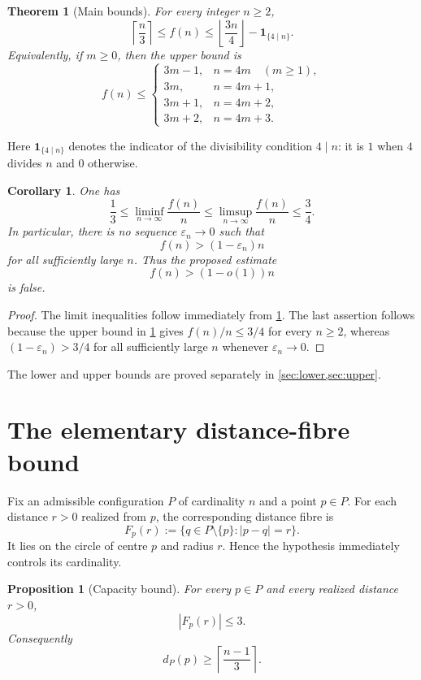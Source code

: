 \documentclass[11pt]{article}
\newtheorem{theorem}{Theorem}[section]
\newtheorem{proposition}[proposition]{Proposition}
\newtheorem{corollary}[corollary]{Corollary}
\theoremstyle{definition}
\theoremstyle{remark}
\newcommand{\ind}{\mathbf{1}}
\begin{document}
\begin{theorem}[Main bounds]\label{thm:main}
For every integer $n\ge 2$,
\[
 \boxed{
 \left\lceil\frac n3\right\rceil
 \le f(n)
 \le
 \left\lfloor\frac{3n}{4}\right\rfloor-
 \ind_{\{4\mid n\}}.}
\]
Equivalently, if $m\ge 0$, then the upper bound is
\[
 f(n)\le
 \begin{cases}
  3m-1,&n=4m\quad(m\ge1),\\
  3m,&n=4m+1,\\
  3m+1,&n=4m+2,\\
  3m+2,&n=4m+3.
 \end{cases}
\]
\end{theorem}

Here $\ind_{\{4\mid n\}}$ denotes the indicator of the divisibility condition $4\mid n$: it is $1$ when $4$ divides $n$ and $0$ otherwise.

\begin{corollary}\label{cor:asymptotic}
One has
\[
 \frac13
 \le \liminf_{n\to\infty}\frac{f(n)}n
 \le \limsup_{n\to\infty}\frac{f(n)}n
 \le \frac34.
\]
In particular, there is no sequence $\varepsilon_n\to0$ such that
\[
 f(n)>(1-\varepsilon_n)n
\]
for all sufficiently large $n$.  Thus the proposed estimate
\[
 f(n)>(1-o(1))n
\]
is false.
\end{corollary}

\begin{proof}
The limit inequalities follow immediately from \cref{thm:main}.  The last assertion follows because the upper bound in \cref{thm:main} gives $f(n)/n\le 3/4$ for every $n\ge2$, whereas $(1-\varepsilon_n)>3/4$ for all sufficiently large $n$ whenever $\varepsilon_n\to0$.
\end{proof}

The lower and upper bounds are proved separately in \cref{sec:lower,sec:upper}.

\section{The elementary distance-fibre bound}\label{sec:fibres}

Fix an admissible configuration $P$ of cardinality $n$ and a point $p\in P$.  For each distance $r>0$ realized from $p$, the corresponding distance fibre is
\[
 F_p(r):=\{q\in P\setminus\{p\}:|p-q|=r\}.
\]
It lies on the circle of centre $p$ and radius $r$.  Hence the hypothesis immediately controls its cardinality.

\begin{proposition}[Capacity bound]\label{prop:capacity}
For every $p\in P$ and every realized distance $r>0$,
\[
 |F_p(r)|\le3.
\]
Consequently
\[
 d_P(p)\ge \left\lceil\frac{n-1}{3}\right\rceil.
\]
\end{proposition}
\end{document}
